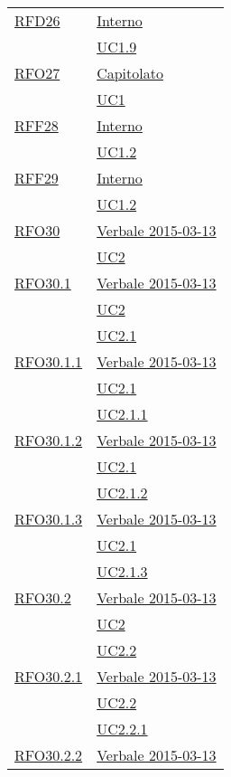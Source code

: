 \begin{longtable}{|>{\centering}m{5cm}|m{5cm}<{\centering}|}
\hyperlink{RFD26}{RFD26} & \hyperlink{Interno}{Interno}\\
& \hyperref[UC1.9]{UC1.9}\\ \hline
\hyperlink{RFO27}{RFO27} & \hyperlink{Capitolato}{Capitolato}\\
& \hyperref[UC1]{UC1}\\ \hline
\hyperlink{RFF28}{RFF28} & \hyperlink{Interno}{Interno}\\
& \hyperref[UC1.2]{UC1.2}\\ \hline
\hyperlink{RFF29}{RFF29} & \hyperlink{Interno}{Interno}\\
& \hyperref[UC1.2]{UC1.2}\\ \hline
\hyperlink{RFO30}{RFO30} & \hyperlink{Verbale 2015-03-13}{Verbale 2015-03-13}\\
& \hyperref[UC2]{UC2}\\ \hline
\hyperlink{RFO30.1}{RFO30.1} & \hyperlink{Verbale 2015-03-13}{Verbale 2015-03-13}\\
& \hyperref[UC2]{UC2}\\
& \hyperref[UC2.1]{UC2.1}\\ \hline
\hyperlink{RFO30.1.1}{RFO30.1.1} & \hyperlink{Verbale 2015-03-13}{Verbale 2015-03-13}\\
& \hyperref[UC2.1]{UC2.1}\\
& \hyperref[UC2.1.1]{UC2.1.1}\\ \hline
\hyperlink{RFO30.1.2}{RFO30.1.2} & \hyperlink{Verbale 2015-03-13}{Verbale 2015-03-13}\\
& \hyperref[UC2.1]{UC2.1}\\
& \hyperref[UC2.1.2]{UC2.1.2}\\ \hline
\hyperlink{RFO30.1.3}{RFO30.1.3} & \hyperlink{Verbale 2015-03-13}{Verbale 2015-03-13}\\
& \hyperref[UC2.1]{UC2.1}\\
& \hyperref[UC2.1.3]{UC2.1.3}\\ \hline
\hyperlink{RFO30.2}{RFO30.2} & \hyperlink{Verbale 2015-03-13}{Verbale 2015-03-13}\\
& \hyperref[UC2]{UC2}\\
& \hyperref[UC2.2]{UC2.2}\\ \hline
\hyperlink{RFO30.2.1}{RFO30.2.1} & \hyperlink{Verbale 2015-03-13}{Verbale 2015-03-13}\\
& \hyperref[UC2.2]{UC2.2}\\
& \hyperref[UC2.2.1]{UC2.2.1}\\ \hline
\hyperlink{RFO30.2.2}{RFO30.2.2} & \hyperlink{Verbale 2015-03-13}{Verbale 2015-03-13}\\

\end{longtable}

